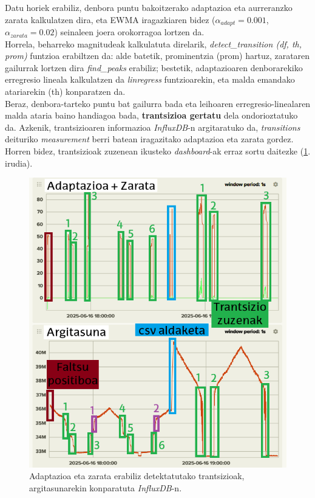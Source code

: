 \documentclass[12pt]{article}
\numberwithin{figure}{section}
\numberwithin{equation}{section}
\begin{document}
Datu horiek erabiliz, denbora puntu bakoitzerako adaptazioa eta aurreranzko zarata kalkulatzen dira, eta EWMA iragazkiaren bidez ($\alpha_{adapt}=0.001$, $\alpha_{zarata}=0.02$) seinaleen joera orokorragoa lortzen da.\\

Horrela, beharreko magnitudeak kalkulatuta direlarik, \textit{detect\_transition (df, th, prom)} funtzioa erabiltzen da: alde batetik, prominentzia (prom) hartuz, zarataren gailurrak lortzen dira \textit{find\_peaks} erabiliz; bestetik, adaptazioaren denborarekiko erregresio lineala kalkulatzen da \textit{linregress} funtzioarekin, eta malda emandako atariarekin (th) konparatzen da.\\ 

Beraz, denbora-tarteko puntu bat gailurra bada eta leihoaren erregresio\hyp{}linealaren malda ataria baino handiagoa bada, \textbf{trantsizioa gertatu} dela ondorioztatuko da. Azkenik, trantsizioaren informazioa \textit{InfluxDB}-n argitaratuko da, \textit{transitions} deituriko \textit{measurement} berri batean iragazitako adaptazioa eta zarata gordez. Horren bidez, trantsizioak zuzenean ikusteko \textit{dashboard}-ak erraz sortu daitezke (\ref{fig:influxdb_transitions}. irudia).

\begin{figure}[h]
    \centering
    \includegraphics[width=0.8\linewidth]{5 - Zerbitzuaren garapena/influxdb_transitions.png}
    \caption{Adaptazioa eta zarata erabiliz detektatutako trantsizioak, argitasunarekin konparatuta \textit{InfluxDB}-n.}
    \label{fig:influxdb_transitions}
\end{figure}
\end{document}
